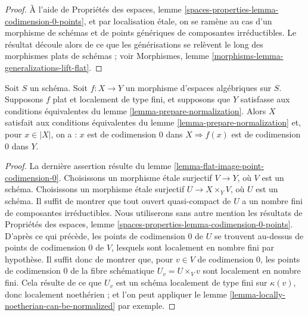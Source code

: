 \begin{proof}
À l'aide de Propriétés des espaces, lemme
\ref{spaces-properties-lemma-codimension-0-points}, et par localisation étale,
on se ramène au cas d'un morphisme de schémas et de points génériques
de composantes irréductibles. Le résultat découle alors de ce que les générisations
se relèvent le long des morphismes plats de schémas ; voir
Morphismes, lemme \ref{morphisms-lemma-generalizations-lift-flat}.
\end{proof}

\begin{lemma}
\label{lemma-flat-locally-finite-type-points-codimension-0}
Soit $S$ un schéma. Soit $f : X \to Y$ un morphisme d'espaces
algébriques sur $S$. Supposons $f$ plat et localement de type fini, et
supposons que $Y$ satisfasse aux conditions équivalentes du
lemme \ref{lemma-prepare-normalization}.
Alors $X$ satisfait aux conditions équivalentes du
lemme \ref{lemma-prepare-normalization} et, pour $x \in |X|$, on a :
$x$ est de codimension $0$ dans $X \Rightarrow f(x)$ est de codimension $0$ dans $Y$.
\end{lemma}

\begin{proof}
La dernière assertion résulte du
lemme \ref{lemma-flat-image-point-codimension-0}.
Choisissons un morphisme étale surjectif $V \to Y$, où $V$ est un schéma.
Choisissons un morphisme étale surjectif $U \to X \times_Y V$, où $U$
est un schéma. Il suffit de montrer que tout ouvert quasi-compact
de $U$ a un nombre fini de composantes irréductibles.
Nous utiliserons sans autre mention les résultats de
Propriétés des espaces, lemme \ref{spaces-properties-lemma-codimension-0-points}.
D'après ce qui précède,
les points de codimension $0$ de $U$ se trouvent au-dessus de
points de codimension $0$ de $V$, lesquels sont localement en nombre fini par
hypothèse. Il suffit donc de montrer que, pour $v \in V$ de codimension $0$,
les points de codimension $0$ de la fibre schématique $U_v = U \times_V v$
sont localement en nombre fini. Cela résulte de ce que $U_v$ est un schéma
localement de type fini sur $\kappa(v)$, donc localement noethérien ;
et l'on peut appliquer le lemme \ref{lemma-locally-noetherian-can-be-normalized}
par exemple.
\end{proof}

